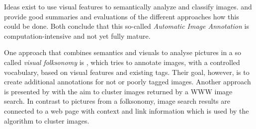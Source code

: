 Ideas exist to use visual features to semantically analyze and classify images. \cite{Liu2007} and \cite{Zhang2012} provide good summaries and evaluations of the different approaches how this could be done. Both conclude that this so-called \emph{Automatic Image Annotation}  is computation-intensive and not yet fully mature.

\bigskip
One approach that combines semantics and visuals to analyse pictures in a so called \emph{visual folksonomy} is \cite{Lindstaedt2009}, which tries to annotate images, with a controlled vocabulary, based on visual features and existing tags. Their goal, however, is to create additional annotations for not or poorly tagged images. Another approach is presented by \cite{cai2004hierarchical} with the aim to cluster images returned by a WWW image search. In contrast to pictures from a folksonomy, image search results are connected to a web page with context and link information which is used by the algorithm to cluster images.

